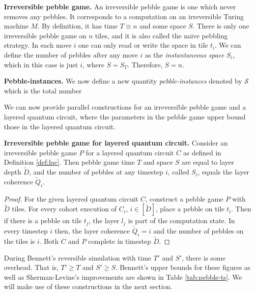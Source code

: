 \begin{definition}{\textbf{Irreversible pebble game.}}
An irreversible pebble game is one which never removes any pebbles.
It corresponds to a computation on an irreversible Turing machine $M$.
By definition, it has time $T \equiv n$ and some space $S$.
There is only one irreversible pebble game on $n$ tiles, and it is also called
the naive pebbling strategy.
In each move $i$ one can only
read or write the space in tile $t_i$.
We can define the number of pebbles after any move $i$ as the \emph{instantaneous space}
$S_i$, which in this case is just $i$, where $S = S_T$.
Therefore, $S = n$.
\end{definition}

\begin{definition}{\textbf{Pebble-instances.}}
We now define a new quantity \emph{pebble-instances} denoted by
$\mathcal{S}$ which is the total number 

We can now provide parallel constructions for an irreversible pebble game
and a layered quantum circuit, where the parameters in the pebble game
upper bound those in the layered quantum circuit.

\begin{theorem}{\textbf{Irreversible pebble game for layered quantum circuit.}}
Consider an irreversible pebble game $P$ for a layered quantum circuit $C$
as defined in 
Definition \ref{def:lqc}. Then pebble game time $T$ and space $S$ are equal to layer depth $\tilde{D}$,
and the number of pebbles at any timestep $i$, called $S_i$, equals the
layer coherence $\tilde{Q}_i$.
\label{thm:ipg-lqc}
\end{theorem}

\begin{proof}
For the given layered quantum circuit $C$, construct a pebble game $P$
with $\tilde{D}$ tiles. For every cohort execution of $C_i$, $i \in [\tilde{D}]$,
place a pebble on tile $t_i$. Then if there is a pebble on tile $t_j$,
the layer $l_j$ is part of the computation state. In every timestep $i$ then, the layer coherence
$\tilde{Q}_i = i$ and the number of pebbles on the tiles is $i$.
Both $C$ and $P$ complete in timestep $\tilde{D}$.
\end{proof}

During Bennett's reversible
simulation with time $T'$ and $S'$, there is some overhead. That is,
$T' \ge T$ and $S' \ge S$. Bennett's upper bounds for these figures
as well as Sherman-Levine's improvements \cite{Levin1990} are shown
in Table \ref{tab:pebble-ts}. We will make use of these constructions in
the next section.


\end{definition}
